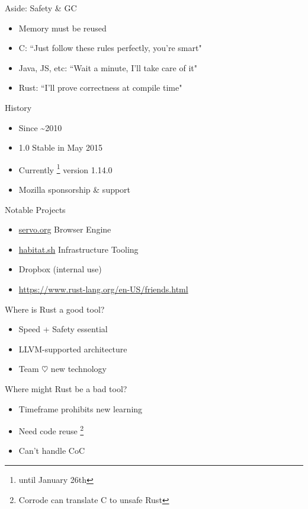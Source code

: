 \documentclass[100pt]{beamer}
\begin{document}
\begin{frame}
    Aside: Safety \& GC
    \begin{itemize}
        \item Memory must be reused
        \item C: ``Just follow these rules perfectly, you're smart"
        \item Java, JS, etc: ``Wait a minute, I'll take care of it"
        \item Rust: ``I'll prove correctness at compile time"
    \end{itemize}
\end{frame}

\begin{frame}
    History
    \begin{itemize}
        \item Since \textasciitilde 2010
        \item 1.0 Stable in May 2015
        \item Currently \footnote{until January 26th} version 1.14.0
        \item Mozilla sponsorship \& support
    \end{itemize}
\end{frame}

\begin{frame}
    Notable Projects
    \begin{itemize}
        \item \url{servo.org} Browser Engine
        \item \url{habitat.sh} Infrastructure Tooling
        \item Dropbox (internal use)
        \item \url{https://www.rust-lang.org/en-US/friends.html}
    \end{itemize}
\end{frame}

\begin{frame}
    Where is Rust a good tool?
    \begin{itemize}
        \item Speed + Safety essential
        \item LLVM-supported architecture
        \item Team $\heartsuit$ new technology
    \end{itemize}
\end{frame}

\begin{frame}
    Where might Rust be a bad tool?
    \begin{itemize}
        \item Timeframe prohibits new learning
        \item Need code reuse \footnote{Corrode can translate C to unsafe Rust}
        \item Can't handle CoC
    \end{itemize}
\end{frame}
\end{document}
